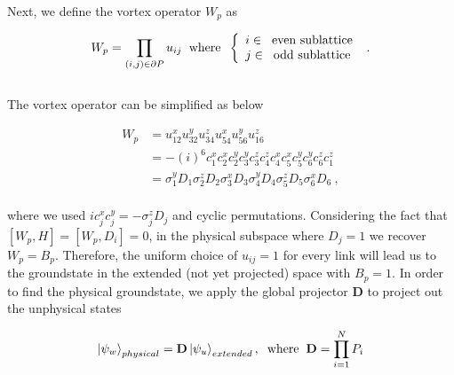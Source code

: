 \documentclass{article}
\begin{document}
Next, we define the vortex operator $W_p$ as

\begin{equation}\label{eq:26}
	\begin{aligned}
		W_p = \prod_{(i,j)\in \partial P} u_{ij} \hspace{2mm}\text{where}\hspace{2mm}
		\left\{
		\begin{array}{l}
            i  \in \hspace{2mm} \text{even sublattice} \\
            j  \in \hspace{2mm} \text{odd sublattice}
        \end{array}
        \right.~.
	\end{aligned}
\end{equation}\\

The vortex operator can be simplified as below

\begin{equation}\label{eq:27}
	\begin{aligned}
		W_p &= u^x_{12}u^y_{32}u^z_{34}u^x_{54}u^y_{56}u^z_{16} \\
		&= -(i)^6 c^x_1 c^x_2 c^y_2 c^y_3 c^z_3 c^z_4 c^x_4 c^x_5 c^y_5 c^y_6 c^z_6 c^z_1 \\
		&= \sigma^y_1 D_1 \sigma^z_2 D_2 \sigma^x_3 D_3 \sigma^y_4 D_4 \sigma^z_5 D_5 \sigma^x_6 D_6 ~,
	\end{aligned}
\end{equation}\\

where we used $i c^x_j c^y_j = -\sigma^z_j D_j$ and cyclic permutations. Considering the fact that $[W_p, H] = [W_p, D_i] = 0$, in the physical subspace where $D_j = 1$ we recover $W_p = B_p$. Therefore, the uniform choice of $u_{ij}=1$ for every link will lead us to the groundstate in the extended (not yet projected) space with $B_p = 1$. In order to find the physical groundstate, we apply the global projector $\mathbf{D}$ to project out the unphysical states

\begin{equation}\label{eq:28}
	\begin{aligned}
		\ket{\psi_w}_{physical} = \mathbf{D} \ket{\psi_u}_{extended},  \hspace{2mm}\text{where}\hspace{2mm} \mathbf{D} = \prod^N_{i=1} P_i
		\end{aligned}
\end{equation}\\
\end{document}
